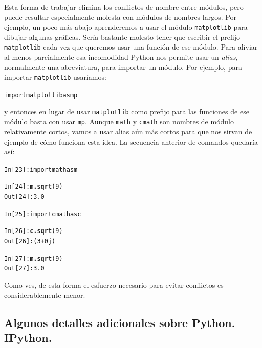 \documentclass[10pt,a4paper]{article}\usepackage[]{graphicx}\usepackage[]{color}
\makeatletter
\newcommand{\hlkwd}[1]{\textcolor[rgb]{0.737,0.353,0.396}{\textbf{#1}}}%
\newenvironment{kframe}{%
 \def\at@end@of@kframe{}%
 \ifinner\ifhmode%
  \def\at@end@of@kframe{\end{minipage}}%
  \begin{minipage}{\columnwidth}%
 \fi\fi%
 \def\FrameCommand##1{\hskip\@totalleftmargin \hskip-\fboxsep
 \colorbox{shadecolor}{##1}\hskip-\fboxsep
     \hskip-\linewidth \hskip-\@totalleftmargin \hskip\columnwidth}%
 \MakeFramed {\advance\hsize-\width
   \@totalleftmargin\z@ \linewidth\hsize
   \@setminipage}}%
 {\par\unskip\endMakeFramed%
 \at@end@of@kframe}
\newenvironment{knitrout}{}{} %
\makeatother
\begin{document}
Esta forma de trabajar elimina los conflictos de nombre entre módulos, pero puede resultar especialmente molesta con módulos de nombres largos. Por ejemplo, un poco más abajo aprenderemos a usar el módulo {\tt matplotlib} para dibujar algunas gráficas. Sería bastante molesto tener que escribir el prefijo {\tt matplotlib} cada vez que queremos usar una función de ese módulo. Para aliviar al menos parcialmente esa incomodidad Python nos permite usar un {\em alias}, normalmente una abreviatura, para importar un módulo. Por ejemplo, para importar {\tt matplotlib} usaríamos:
\begin{knitrout}
\color{fgcolor}\begin{kframe}
\begin{alltt}
import matplotlib as mp
\end{alltt}
\end{kframe}
\end{knitrout}
y entonces en lugar de usar {\tt matplotlib} como prefijo para las funciones de ese módulo basta con usar {\tt mp}. Aunque {\tt math} y {\tt cmath} son nombres de módulo relativamente cortos, vamos a usar alias aún más cortos para que nos sirvan de ejemplo de cómo funciona esta idea. La secuencia anterior de comandos quedaría así:
\begin{knitrout}
\color{fgcolor}\begin{kframe}
\begin{alltt}
In [23]: import math as m

In [24]: \hlkwd{m.sqrt}(9)
Out[24]: 3.0

In [25]: import cmath as c

In [26]: \hlkwd{c.sqrt}(9)
Out[26]: (3+0j)

In [27]: \hlkwd{m.sqrt}(9)
Out[27]: 3.0
\end{alltt}
\end{kframe}
\end{knitrout}
Como ves, de esta forma el esfuerzo necesario para evitar conflictos es considerablemente menor.

\subsection{Algunos detalles adicionales sobre Python. IPython.}
\label{tut02:subsec:AlgunosDetallesAdicionalesIPython}
\end{document}
